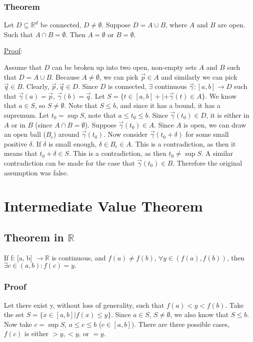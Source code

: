 \documentclass[11 pt, twoside]{article}
\begin{document}
\subsubsection{Theorem}

Let $D \subseteq \mathbb{R}^d$ be connected, $D \neq \emptyset$. Suppose $D =
A \cup B$, where $A$ and $B$ are open. Such that $A \cap B = \emptyset$. Then $A
= \emptyset$ or $B = \emptyset$.

\underline{Proof}:

Assume that $D$ can be broken up into two open, non-empty sets $A$ and $B$ such
that $D = A \cup B$. Because $A \neq \emptyset$, we can pick $\vec{p} \in A$ and
similarly we can pick $\vec{q} \in B$. Clearly, $\vec{p}, \vec{q} \in D$. Since
$D$ is connected, $\exists$ continuous $\vec{\gamma}: [a, b] \to D$ such that
$\vec{\gamma}(a) = \vec{p}$, $\vec{\gamma}(b) = \vec{q}$. Let $S = \{t \in [a,b]
+|+ \vec{\gamma}(t) \in A\}$. We know that $a \in S$, so $S \neq \emptyset$.
Note that $S \leq b$, and since it has a bound, it has a supremum. Let $t_0 =
\sup S$, note that $a \leq t_0 \leq b$. Since $\vec{\gamma}(t_0) \in D$, it is
either in $A$ or in $B$ (since $A \cap B = \emptyset$). Suppose
$\vec{\gamma}(t_0) \in A$. Since $A$ is open, we can draw an open ball
($B_\epsilon$) around $\vec{\gamma}(t_0)$. Now consider $\vec{\gamma}(t_0 +
\delta)$ for some small positive $\delta$. If $\delta$ is small enough, $\delta
\in B_\epsilon \in A$. This is a contradiction, as then it means that $t_0 +
\delta \in S$. This is a contradiction, as then $t_0 \neq \sup S$. A similar
contradiction can be made for the case that $\vec{\gamma}(t_0) \in B$. Therefore
the original assumption was false.

\section{Intermediate Value Theorem}

\subsection{Theorem in $\mathbb{R}$}
If f: [a, b] $\to \mathbb{R}$ is continuous, and $f(a) \neq f(b)$, $\forall y \in (f(a), f(b))$, then $\exists c \in (a, b): f(c) = y.$

\subsubsection{Proof}
Let there exist y, without loss of generality, such that $f(a) < y < f(b)$. Take the set $S = \{x \in [a, b] | f(x) \leq
y\}$. Since $a \in S$, $S \neq \emptyset$, we also know that $S \leq b$. Now
take $c = \sup S$, $a \leq c \leq b$ ($c \in [a, b]$). There are three possible
cases, $f(c)$ is either $> y, < y$, or $= y$.
\end{document}
